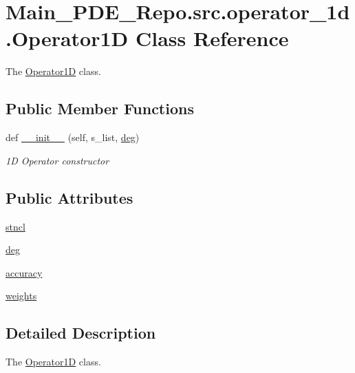\hypertarget{classMain__PDE__Repo_1_1src_1_1operator__1d_1_1Operator1D}{}\section{Main\+\_\+\+P\+D\+E\+\_\+\+Repo.\+src.\+operator\+\_\+1d.\+Operator1D Class Reference}
\label{classMain__PDE__Repo_1_1src_1_1operator__1d_1_1Operator1D}


The \hyperlink{classMain__PDE__Repo_1_1src_1_1operator__1d_1_1Operator1D}{Operator1D} class.  


\subsection*{Public Member Functions}
\begin{DoxyCompactItemize}
\item 
def \hyperlink{classMain__PDE__Repo_1_1src_1_1operator__1d_1_1Operator1D_a4e18976c3de7791d78f8a8950ec50d2f}{\+\_\+\+\_\+init\+\_\+\+\_\+} (self, s\+\_\+list, \hyperlink{classMain__PDE__Repo_1_1src_1_1operator__1d_1_1Operator1D_a84edadfc5eadaa3c21e56c51cbe9c94b}{deg})
\begin{DoxyCompactList}\small\item\em 1D Operator constructor \end{DoxyCompactList}\end{DoxyCompactItemize}
\subsection*{Public Attributes}
\begin{DoxyCompactItemize}
\item 
\hyperlink{classMain__PDE__Repo_1_1src_1_1operator__1d_1_1Operator1D_a37a9116a49b9aa2a799a7a6afe93b2cb}{stncl}
\item 
\hyperlink{classMain__PDE__Repo_1_1src_1_1operator__1d_1_1Operator1D_a84edadfc5eadaa3c21e56c51cbe9c94b}{deg}
\item 
\hyperlink{classMain__PDE__Repo_1_1src_1_1operator__1d_1_1Operator1D_a1b236addd7ef51377c7de08475afc2a8}{accuracy}
\item 
\hyperlink{classMain__PDE__Repo_1_1src_1_1operator__1d_1_1Operator1D_a5c14bf1f562fbd76aa191a37e1ca8355}{weights}
\end{DoxyCompactItemize}


\subsection{Detailed Description}
The \hyperlink{classMain__PDE__Repo_1_1src_1_1operator__1d_1_1Operator1D}{Operator1D} class. 

